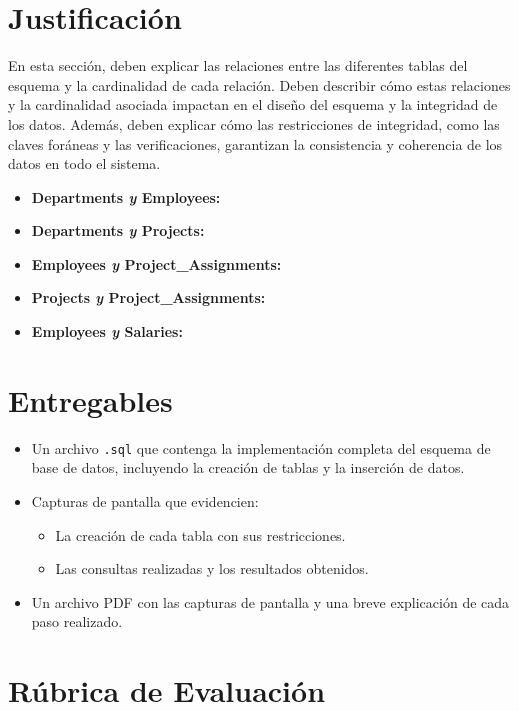 \section*{Justificación}

En esta sección, deben explicar las relaciones entre las diferentes tablas del esquema y la cardinalidad de cada relación. 
Deben describir cómo estas relaciones y la cardinalidad asociada impactan en el diseño del esquema y la integridad de los datos. Además, deben explicar cómo las restricciones de integridad, como las claves foráneas y las verificaciones, garantizan la consistencia y coherencia de los datos en todo el sistema.
\begin{itemize}
    \item \textbf{Departments \textit{y} Employees:} 
    \item \textbf{Departments \textit{y} Projects:} 
    \item \textbf{Employees \textit{y} Project\_Assignments:} 
    \item \textbf{Projects \textit{y} Project\_Assignments:} 
    \item \textbf{Employees \textit{y} Salaries:} 
\end{itemize}
\section*{Entregables}

\begin{itemize}
    \item Un archivo \texttt{.sql} que contenga la implementación completa del esquema de base de datos, incluyendo la creación de tablas y la inserción de datos.
    \item Capturas de pantalla que evidencien:
    \begin{itemize}
        \item La creación de cada tabla con sus restricciones.
        \item Las consultas realizadas y los resultados obtenidos.
    \end{itemize}
    \item Un archivo PDF con las capturas de pantalla y una breve explicación de cada paso realizado.
\end{itemize}

\section*{Rúbrica de Evaluación}

